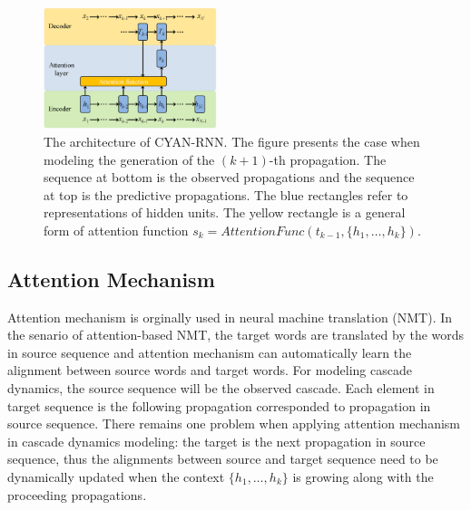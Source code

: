 \begin{figure}[t]
\centering
\includegraphics[width=0.45\textwidth]{figs/cyanrnn_framework.png}
\caption{The architecture of CYAN-RNN. The figure presents the case when
modeling the generation of the $(k+1)$-th propagation. The sequence at bottom is
the observed propagations and the sequence at top is the predictive
propagations. The blue rectangles refer to representations of hidden units.
The yellow rectangle is a general form of attention function
$s_k=\textit{AttentionFunc}(t_{k-1}, \{h_1,\ldots,h_k\})$.}
\label{fig:cyrnn_frame}
\end{figure}

\subsection{Attention Mechanism}
Attention mechanism is orginally used in neural machine translation (NMT).
In the senario of attention-based NMT, the target words are translated by the
words in source sequence and attention mechanism can automatically learn the alignment
between source words and target words.
For modeling cascade dynamics, the source sequence will be the observed
cascade.
Each element in target sequence is the following propagation corresponded to
propagation in source sequence.
There remains one problem when applying attention mechanism in cascade dynamics
modeling: the target is the next propagation in source
sequence, thus the alignments between source and target sequence need to be dynamically updated
when the context $\{h_1,\ldots,h_k\}$ is growing along with the proceeding
propagations.


